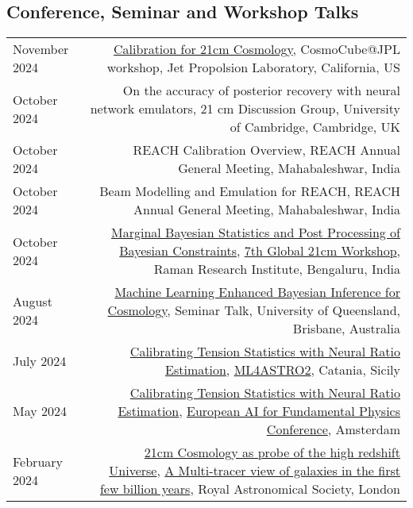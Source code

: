 \documentclass{article}
\begin{document}
\subsection*{Conference, Seminar and Workshop Talks}
\begin{tabular}{L!{\vrule}R}
    November 2024 & \href{https://github.com/htjb/Talks/raw/master/Talks/CosmoCube-JPL-Workshop-2024/calibration-jpl-cosmocube.pdf}{Calibration for 21cm Cosmology}, CosmoCube@JPL workshop, Jet Propolsion Laboratory, California, US \\
    October 2024 & On the accuracy of posterior recovery with neural network emulators, 21 cm Discussion Group, University of Cambridge, Cambridge, UK \\
    October 2024 & REACH Calibration Overview, REACH Annual General Meeting, Mahabaleshwar, India \\
    October 2024 & Beam Modelling and Emulation for REACH, REACH Annual General Meeting, Mahabaleshwar, India \\
    October 2024 & \href{https://github.com/htjb/Talks/raw/master/Talks/7th-Global-Workshop/margarine.pdf}{Marginal Bayesian Statistics and Post Processing of Bayesian Constraints}, \href{https://sites.google.com/view/global-21-cm-workshop}{7th Global 21cm Workshop}, Raman Research Institute, Bengaluru, India \\
    August 2024 & \href{https://github.com/htjb/Talks/tree/master/Talks/brisbane_davis_group_meeting_2024}{Machine Learning Enhanced Bayesian Inference for Cosmology}, Seminar Talk, University of Queensland, Brisbane, Australia \\
    July 2024 & \href{https://github.com/htjb/Talks/raw/master/Talks/ML4ASTRO-Tensionnets/tensions.pdf}{Calibrating Tension Statistics with Neural Ratio Estimation}, \href{https://indico.ict.inaf.it/event/2690/}{ML4ASTRO2}, Catania, Sicily \\
    May 2024 & \href{https://github.com/htjb/Talks/raw/master/Talks/Amsterdam-EuCAIF-2024/tensions.pdf}{Calibrating Tension Statistics with Neural Ratio Estimation}, \href{https://indico.nikhef.nl/event/4875/}{European AI for Fundamental Physics Conference}, Amsterdam \\
    February 2024 & \href{https://github.com/htjb/Talks/raw/master/Talks/RAS_Multi-tracer_View/21cmCosmo.pdf}{21cm Cosmology as probe of the high redshift Universe}, \href{https://ras.ac.uk/events-and-meetings/ras-meetings/multi-tracer-view-galaxies-first-few-billion-years}{A Multi-tracer view of galaxies in the first few billion years}, Royal Astronomical Society, London \\

\end{tabular}
\end{document}
